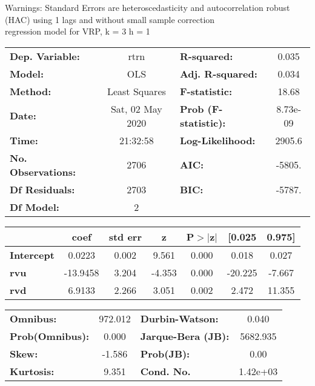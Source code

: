 Warnings: \newline
 [1] Standard Errors are heteroscedasticity and autocorrelation robust (HAC) using 1 lags and without small sample correction\\ 

regression model for VRP, k = 3 h = 1\begin{center}
\begin{tabular}{lclc}
\toprule
\textbf{Dep. Variable:}    &       rtrn       & \textbf{  R-squared:         } &     0.035   \\
\textbf{Model:}            &       OLS        & \textbf{  Adj. R-squared:    } &     0.034   \\
\textbf{Method:}           &  Least Squares   & \textbf{  F-statistic:       } &     18.68   \\
\textbf{Date:}             & Sat, 02 May 2020 & \textbf{  Prob (F-statistic):} &  8.73e-09   \\
\textbf{Time:}             &     21:32:58     & \textbf{  Log-Likelihood:    } &    2905.6   \\
\textbf{No. Observations:} &        2706      & \textbf{  AIC:               } &    -5805.   \\
\textbf{Df Residuals:}     &        2703      & \textbf{  BIC:               } &    -5787.   \\
\textbf{Df Model:}         &           2      & \textbf{                     } &             \\
\bottomrule
\end{tabular}
\begin{tabular}{lcccccc}
                   & \textbf{coef} & \textbf{std err} & \textbf{z} & \textbf{P$> |$z$|$} & \textbf{[0.025} & \textbf{0.975]}  \\
\midrule
\textbf{Intercept} &       0.0223  &        0.002     &     9.561  &         0.000        &        0.018    &        0.027     \\
\textbf{rvu}       &     -13.9458  &        3.204     &    -4.353  &         0.000        &      -20.225    &       -7.667     \\
\textbf{rvd}       &       6.9133  &        2.266     &     3.051  &         0.002        &        2.472    &       11.355     \\
\bottomrule
\end{tabular}
\begin{tabular}{lclc}
\textbf{Omnibus:}       & 972.012 & \textbf{  Durbin-Watson:     } &    0.040  \\
\textbf{Prob(Omnibus):} &   0.000 & \textbf{  Jarque-Bera (JB):  } & 5682.935  \\
\textbf{Skew:}          &  -1.586 & \textbf{  Prob(JB):          } &     0.00  \\
\textbf{Kurtosis:}      &   9.351 & \textbf{  Cond. No.          } & 1.42e+03  \\
\bottomrule
\end{tabular}
\end{center}

